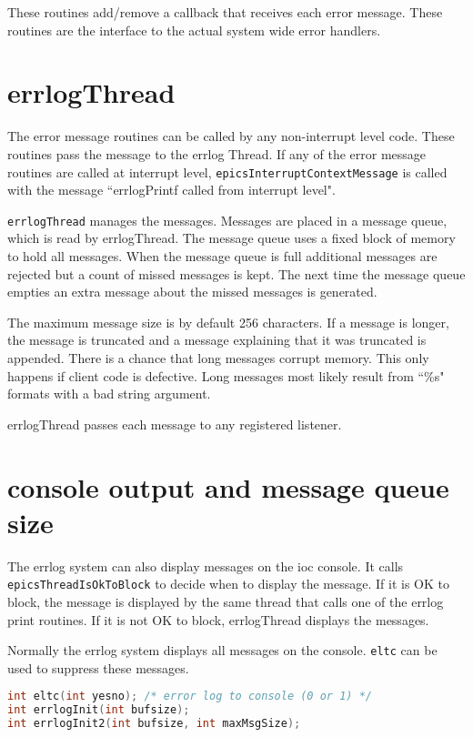 These routines add/remove a callback that receives each error message.
These routines are the interface to the actual system wide error handlers.

\section{errlogThread}

The error message routines can be called by any non-interrupt level code.
These routines pass the message to the errlog Thread.
If any of the error message routines are called at interrupt level, \verb|epicsInterruptContextMessage| is called with the message ``errlogPrintf called from interrupt level".

\verb|errlogThread| manages the messages.
Messages are placed in a message queue, which is read by errlogThread.
The message queue uses a fixed block of memory to hold all messages.
When the message queue is full additional messages are rejected but a count of missed messages is kept.
The next time the message queue empties an extra message about the missed messages is generated.

The maximum message size is by default 256 characters.
If a message is longer, the message is truncated and a message explaining that it was truncated is appended.
There is a chance that long messages corrupt memory.
This only happens if client code is defective.
Long messages most likely result from ``\%s" formats with a bad string argument.

errlogThread passes each message to any registered listener.

\section{console output and message queue size}

The errlog system can also display messages on the ioc console.
It calls \verb|epicsThreadIsOkToBlock| to decide when to display the message.
If it is OK to block, the message is displayed by the same thread that calls one of the errlog print routines.
If it is not OK to block, errlogThread displays the messages.

Normally the errlog system displays all messages on the console.
\verb|eltc| can be used to suppress these messages.

\begin{lstlisting}[language=C]
int eltc(int yesno); /* error log to console (0 or 1) */
int errlogInit(int bufsize);
int errlogInit2(int bufsize, int maxMsgSize);
\end{lstlisting}

